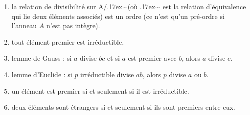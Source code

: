 \documentclass[a4paper,11pt]{article}
\newcommand{\mytilde}{\raise.17ex\hbox{$\scriptstyle\mathtt{\sim}$}\xspace}
\begin{document}
\renewcommand{\labelenumi}{(\arabic{enumi}) }
\begin{enumerate}
\item la relation de divisibilité sur A/\mytilde (où \mytilde est la
  relation d'équivalence qui lie deux éléments associés) est un ordre
  (ce n'est qu'un pré-ordre si l'anneau $A$ n'est pas intègre).

\item tout élément premier est irréductible.

\item lemme de Gauss : si $a$ divise $bc$ et si $a$ est premier
  avec $b$, alors $a$ divise $c$.

\item lemme d'Euclide : si $p$ irréductible divise $ab$,
  alors $p$ divise $a$ ou $b$.

\item un élément est premier si et seulement si il est irréductible.

\item deux éléments sont étrangers si et seulement si ils sont premiers
  entre eux.
\end{enumerate}
\end{document}
